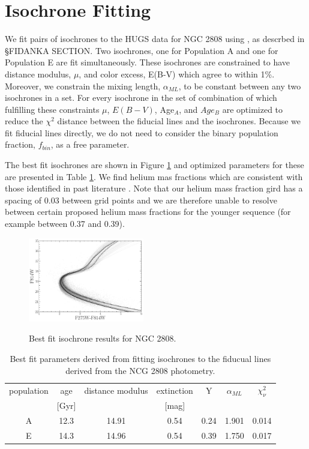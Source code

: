\section{Isochrone Fitting}\label{sec:isoFit}
We fit pairs of isochrones to the HUGS data for NGC 2808 using \fidanka, as
descrbed in \S {\color{red}FIDANKA SECTION}. Two isochrones, one for Population
A and one for Population E are fit simultaneously. These isochrones are
constrained to have distance modulus, $\mu$, and color excess, E(B-V) which agree to within 1\%.
Moreover, we constrain the mixing length, $\alpha_{ML}$, to be constant between
any two isochrones in a set. For every isochrone in the set of combination of
which fulfilling these constraints $\mu$, $E(B-V)$, Age$_{A}$, and $Age_{B}$
are optimized to reduce the $\chi^{2}$ distance between the fiducial
lines and the isochrones. Because we fit fiducial lines directly,
we do not need to consider the binary population fraction, $f_{bin}$, as a free
parameter.

The best fit isochrones are shown in Figure \ref{fig:BestFitResults} and optimized
parameters for these are presented in Table \ref{tab:BestFitResults}. We find helium mas fractions which are consistent with those identified in past literature \citep[e.g.][]{Milone2015}. Note that our helium mass fraction gird has a spacing of 0.03 between grid points and we are therefore unable to resolve between certain proposed helium mass fractions for the younger sequence (for example between 0.37 and 0.39).

\begin{figure}
  \centering
  \includegraphics[width=0.45\textwidth]{src/figures/BestFitResults.pdf}
  \label{fig:BestFitResults}
  \caption{Best fit isochrone results for NGC 2808.}
\end{figure}

\begin{table}
  \centering
  \begin{tabular}{c | c c c c c c}
    \hline
    population & age & distance modulus & extinction & Y & $\alpha_{ML}$ & $\chi^{2}_{\nu}$\\
    & [Gyr] & & [mag] & & &\\
    \hline
    \hline
    A & 12.3 & 14.91 & 0.54 & 0.24 & 1.901 & 0.014\\
    E & 14.3 & 14.96 & 0.54 & 0.39 & 1.750 & 0.017 \\
    \hline
  \end{tabular}
  \label{tab:BestFitResults}
  \caption{Best fit parameters derived from fitting isochrones to the fiducual lines derived from the NCG 2808 photometry.}
\end{table}



